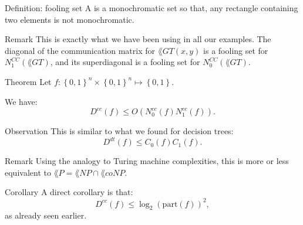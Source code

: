 \documentclass[a4paper]{article}
\begin{document}
\begin{parag}{Definition: fooling set}
    A  is a monochromatic set so that, any rectangle containing two elements is not monochromatic.

    \begin{subparag}{Remark}
        This is exactly what we have been using in all our examples. The diagonal of the communication matrix for $\lang{GT}\left(x, y\right)$ is a fooling set for $N_1^{CC}\left(\lang{GT}\right)$, and its superdiagonal is a fooling set for $N_0^{CC}\left(\lang{GT}\right)$.
    \end{subparag}
\end{parag}

\begin{parag}{Theorem}
    Let $f: \left\{0, 1\right\}^n \times \left\{0, 1\right\}^n \mapsto \left\{0, 1\right\}$.

    We have: 
    \[D^{cc}\left(f\right) \leq O\left(N_0^{cc}\left(f\right) N_1^{cc}\left(f\right)\right).\]

    \begin{subparag}{Observation}
        This is similar to what we found for decision trees: 
        \[D^{dt}\left(f\right) \leq C_0\left(f\right) C_1\left(f\right).\]
    \end{subparag}
    
    \begin{subparag}{Remark}
        Using the analogy to Turing machine complexities, this is more or less equivalent to $\lang{P} = \lang{NP} \cap \lang{coNP}$.
    \end{subparag}

    \begin{subparag}{Corollary}
        A direct corollary is that:
        \[D^{cc}\left(f\right) \leq \log_2\left(\text{part}\left(f\right)\right)^2,\]
        as already seen earlier.
    \end{subparag}
\end{parag}
\end{document}
